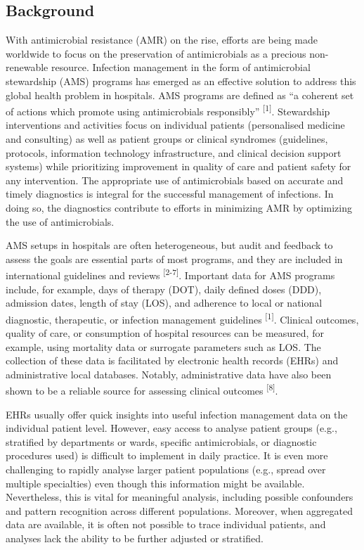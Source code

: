 \documentclass[
]{book}
\begin{document}
\hypertarget{background-1}{%
\subsection{Background}\label{background-1}}

With antimicrobial resistance (AMR) on the rise, efforts are being made worldwide to focus on the preservation of antimicrobials as a precious non-renewable resource. Infection management in the form of antimicrobial stewardship (AMS) programs has emerged as an effective solution to address this global health problem in hospitals. AMS programs are defined as ``a coherent set of actions which promote using antimicrobials responsibly'' \textsuperscript{{[}1{]}}. Stewardship interventions and activities focus on individual patients (personalised medicine and consulting) as well as patient groups or clinical syndromes (guidelines, protocols, information technology infrastructure, and clinical decision support systems) while prioritizing improvement in quality of care and patient safety for any intervention. The appropriate use of antimicrobials based on accurate and timely diagnostics is integral for the successful management of infections. In doing so, the diagnostics contribute to efforts in minimizing AMR by optimizing the use of antimicrobials.

AMS setups in hospitals are often heterogeneous, but audit and feedback to assess the goals are essential parts of most programs, and they are included in international guidelines and reviews \textsuperscript{{[}2-7{]}}. Important data for AMS programs include, for example, days of therapy (DOT), daily defined doses (DDD), admission dates, length of stay (LOS), and adherence to local or national diagnostic, therapeutic, or infection management guidelines \textsuperscript{{[}1{]}}. Clinical outcomes, quality of care, or consumption of hospital resources can be measured, for example, using mortality data or surrogate parameters such as LOS. The collection of these data is facilitated by electronic health records (EHRs) and administrative local databases. Notably, administrative data have also been shown to be a reliable source for assessing clinical outcomes \textsuperscript{{[}8{]}}.

EHRs usually offer quick insights into useful infection management data on the individual patient level. However, easy access to analyse patient groups (e.g., stratified by departments or wards, specific antimicrobials, or diagnostic procedures used) is difficult to implement in daily practice. It is even more challenging to rapidly analyse larger patient populations (e.g., spread over multiple specialties) even though this information might be available. Nevertheless, this is vital for meaningful analysis, including possible confounders and pattern recognition across different populations. Moreover, when aggregated data are available, it is often not possible to trace individual patients, and analyses lack the ability to be further adjusted or stratified.
\end{document}
